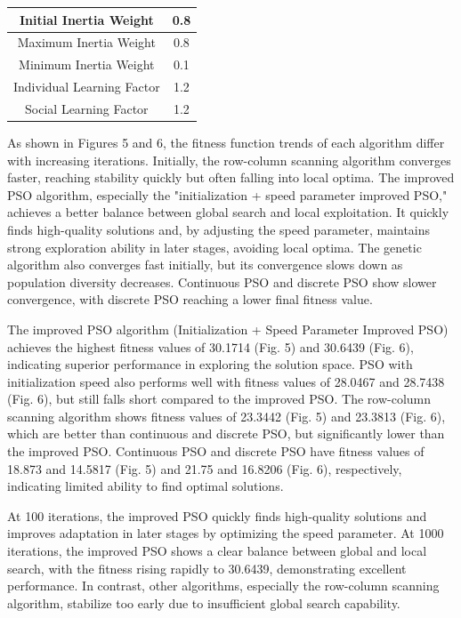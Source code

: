 \documentclass[lettersize,journal]{IEEEtran}
\begin{document}
\begin{table}[!t]
\begin{tabular}{|c||c|}
    \hline
    Initial Inertia Weight               & 0.8                          \\
    \hline
    Maximum Inertia Weight               & 0.8                          \\
    \hline
    Minimum Inertia Weight               & 0.1                          \\
    \hline
    Individual Learning Factor           & 1.2                          \\
    \hline
    Social Learning Factor               & 1.2                          \\
    \hline
  \end{tabular}
\end{table}



As shown in Figures 5 and 6, the fitness function trends of each algorithm differ with increasing iterations. Initially, the row-column scanning algorithm converges faster, reaching stability quickly but often falling into local optima. The improved PSO algorithm, especially the "initialization + speed parameter improved PSO," achieves a better balance between global search and local exploitation. It quickly finds high-quality solutions and, by adjusting the speed parameter, maintains strong exploration ability in later stages, avoiding local optima. The genetic algorithm also converges fast initially, but its convergence slows down as population diversity decreases. Continuous PSO and discrete PSO show slower convergence, with discrete PSO reaching a lower final fitness value.

The improved PSO algorithm (Initialization + Speed Parameter Improved PSO) achieves the highest fitness values of 30.1714 (Fig. 5) and 30.6439 (Fig. 6), indicating superior performance in exploring the solution space. PSO with initialization speed also performs well with fitness values of 28.0467 and 28.7438 (Fig. 6), but still falls short compared to the improved PSO. The row-column scanning algorithm shows fitness values of 23.3442 (Fig. 5) and 23.3813 (Fig. 6), which are better than continuous and discrete PSO, but significantly lower than the improved PSO. Continuous PSO and discrete PSO have fitness values of 18.873 and 14.5817 (Fig. 5) and 21.75 and 16.8206 (Fig. 6), respectively, indicating limited ability to find optimal solutions.

At 100 iterations, the improved PSO quickly finds high-quality solutions and improves adaptation in later stages by optimizing the speed parameter. At 1000 iterations, the improved PSO shows a clear balance between global and local search, with the fitness rising rapidly to 30.6439, demonstrating excellent performance. In contrast, other algorithms, especially the row-column scanning algorithm, stabilize too early due to insufficient global search capability.
\end{document}

